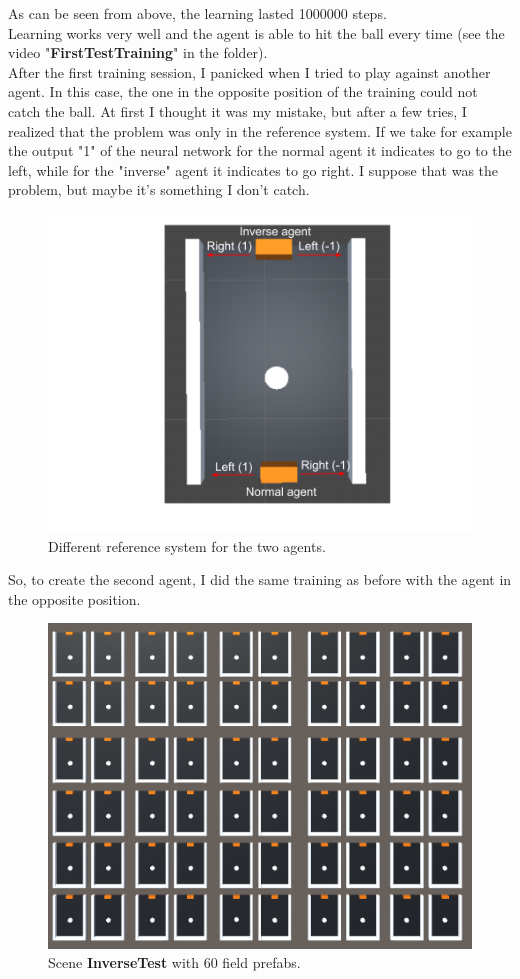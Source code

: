 \documentclass[12pt]{article}
\begin{document}
	\noindent	
	As can be seen from above, the learning lasted 1000000 steps. \\
	Learning works very well and the agent is able to hit the ball every time (see the video "\textbf{FirstTestTraining}" in the folder). \\
	After the first training session, I panicked when I tried to play against another agent. In this case, the one in the opposite position of the training could not catch the ball. At first I thought it was my mistake, but after a few tries, I realized that the problem was only in the reference system. If we take for example the output "1" of the neural network for the normal agent it indicates to go to the left, while for the "inverse" agent it indicates to go right. I suppose that was the problem, but maybe it's something I don't catch.
	
	\begin{figure}[hbt!]
		\centering
		\includegraphics[width= 1
		\textwidth]{images/AvsA.png}
		\caption{Different reference system for the two agents.}
	\end{figure}
	
	\noindent
	 So, to create the second agent, I did the same training as before with the agent in the opposite position.
	 \newpage
	
	\begin{figure}[hbt!]
		\centering
		\includegraphics[width= 0.76
		\textwidth]{images/InverseTraining1.png}
		\caption{Scene \textbf{InverseTest} with 60 field prefabs.}
	\end{figure}
	
\end{document}
